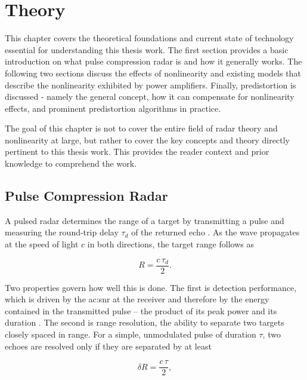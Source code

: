 %
\chapter{Theory}\label{ch:theory}

This chapter covers the theoretical foundations and current state of technology essential for understanding this thesis work. The first section provides a basic introduction on what pulse compression radar is and how it generally works. The following two sections discuss the effects of nonlinearity and existing models that describe the nonlinearity exhibited by power amplifiers. Finally, predistortion is discussed - namely the general concept, how it can compensate for nonlinearity effects, and prominent predistortion algorithms in practice.

The goal of this chapter is not to cover the entire field of radar theory and nonlinearity at large, but rather to cover the key concepts and theory directly pertinent to this thesis work. This provides the reader context and prior knowledge to comprehend the work. 

\section{Pulse Compression Radar}\label{sec:pulse_compression_radar}

A pulsed radar determines the range of a target by transmitting a pulse and measuring the round-trip delay $\tau_d$ of the returned echo \cite{pozar}. As the wave propagates at the speed of light $c$ in both directions, the target range follows as

\begin{equation}
  R = \frac{c\,\tau_d}{2}.
  \label{eq:radar_range}
\end{equation}

Two properties govern how well this is done. The first is detection performance, which is driven by the \gls{ac:snr} at the receiver and therefore by the energy contained in the transmitted pulse -- the product of its peak power and its duration \cite{pomr}. The second is range resolution, the ability to separate two targets closely spaced in range. For a simple, unmodulated pulse of duration $\tau$, two echoes are resolved only if they are separated by at least

\begin{equation}
  \delta R = \frac{c\,\tau}{2},
  \label{eq:simple_pulse_resolution}
\end{equation}


